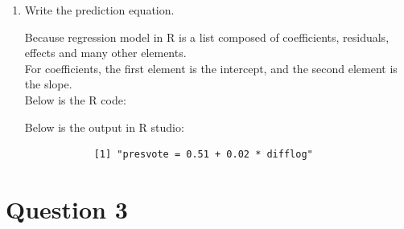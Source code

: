 \documentclass[12pt,letterpaper]{article}
\begin{document}
\begin{enumerate}
		Below is the R code:
		
		Below is the output in R studio: 
		\begin{verbatim}
		> str(q2_residuals) Named num [1:3193] 0.00561 0.03758 -0.05313 
		-0.05299 -0.04584 ... 
		- attr(*, "names")= chr [1:3193] "1" "2" "3" "4" ...
		> summary(q2_residuals)   Min.  1st Qu.   Median  Mean  3rd Qu.  Max.
		-0.321965 -0.074069 -0.001018  0.000000  0.071507  0.427435
		\end{verbatim}
		
		\newpage
		
		\item Write the prediction equation. 
		
		Because regression model in R is a list composed of coefficients, residuals, effects and many other elements. \\
		
		For coefficients, the first element is the intercept, and the second element is the slope. \\
		
		Below is the R code:
		
		
		Below is the output in R studio:
		\begin{verbatim}
			[1] "presvote = 0.51 + 0.02 * difflog"
		\end{verbatim}
		\newpage
	\end{enumerate}
	
	\newpage	
\section*{Question 3}
\end{document}
